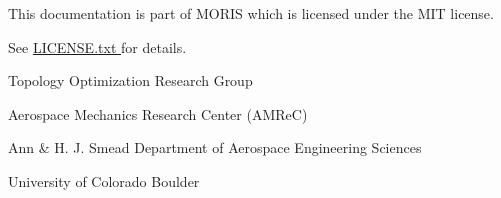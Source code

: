 
\vspace{2.0cm}

\centerline{This documentation is part of MORIS which is licensed under the MIT license. }
\centerline{See \href{https://github.com/kkmaute/moris/blob/main/LICENSE.txt}{LICENSE.txt \ExternalLink} for details.}

\vspace{1.5cm}

\centerline{Topology Optimization Research Group}
\centerline{Aerospace Mechanics Research Center (AMReC)}
\centerline{Ann \& H. J. Smead Department of Aerospace Engineering Sciences}
\centerline{University of Colorado Boulder}


\newpage
